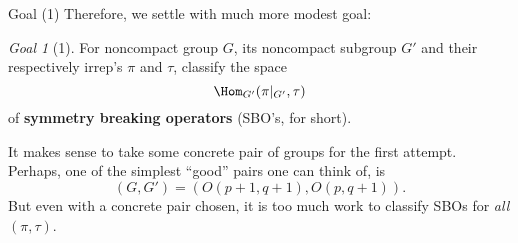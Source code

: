 \documentclass[pdf]{beamer}
\theoremstyle{mystyle}
\theoremstyle{remark}
\newtheorem{goal}{Goal}[section]
\begin{document}
\begin{frame}{Goal (1)}
	Therefore, we settle with much more modest goal:
	\begin{goal}[1]
		For noncompact group $G$, its noncompact subgroup $G'$ and their respectively irrep's $\pi$ and $\tau$, classify the space\begin{equation*}
			\Hom_{G'}(\pi\kern-0.1cm\mid_{G'},\tau)
		\end{equation*}
		of {\bf symmetry breaking operators} (SBO's, for short).
	\end{goal}
	It makes sense to take some concrete pair of groups for the first attempt. Perhaps, one of the simplest ``good'' pairs one can think of, is \begin{equation*}
		\left( G,G' \right)=(O(p+1,q+1),O(p,q+1)).
	\end{equation*}
	But even with a concrete pair chosen, it is too much work to classify SBOs for {\it all} $(\pi,\tau)$.
\end{frame}
\end{document}
